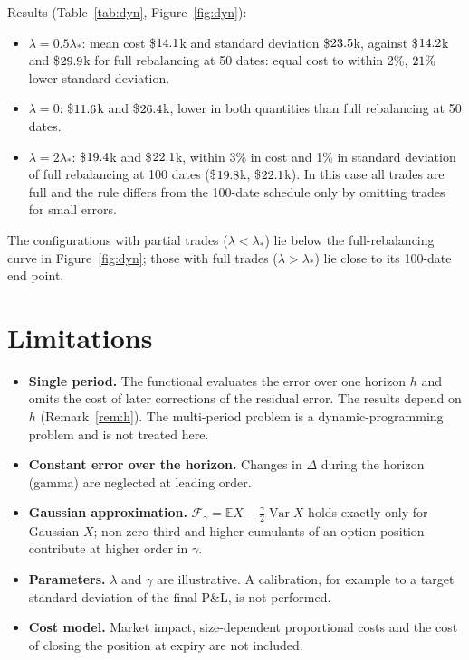 \documentclass[11pt,a4paper]{article}
\theoremstyle{remark}
\newcommand{\E}{\mathbb{E}}
\newcommand{\Var}{\operatorname{Var}}
\newcommand{\F}{\mathcal{F}}
\begin{document}
Results (Table~\ref{tab:dyn}, Figure~\ref{fig:dyn}):
\begin{itemize}
  \item $\lambda = 0.5\lambda_*$: mean cost \$$14.1$k and standard deviation
        \$$23.5$k, against \$$14.2$k and \$$29.9$k for full
        rebalancing at 50 dates: equal cost to within 2\%, $21\%$ lower
        standard deviation.
  \item $\lambda = 0$: \$$11.6$k and \$$26.4$k, lower in both quantities
        than full rebalancing at 50 dates.
  \item $\lambda = 2\lambda_*$: \$$19.4$k and \$$22.1$k, within 3\% in cost
        and 1\% in standard deviation of full rebalancing at 100 dates
        (\$$19.8$k, \$$22.1$k). In this case all trades are full and the
        rule differs from the 100-date schedule only by omitting trades for small errors.
\end{itemize}
The configurations with partial trades ($\lambda<\lambda_*$) lie below the full-rebalancing
curve in Figure~\ref{fig:dyn}; those with full trades ($\lambda>\lambda_*$) lie close to its
100-date end point.

\section{Limitations}\label{sec:limits}

\begin{itemize}
  \item \textbf{Single period.} The functional evaluates the error over one horizon $h$ and
        omits the cost of later corrections of the residual error. The results depend on
        $h$ (Remark~\ref{rem:h}). The multi-period problem is a dynamic-programming problem
        and is not treated here.
  \item \textbf{Constant error over the horizon.} Changes in $\Delta$ during the horizon
        (gamma) are neglected at leading order.
  \item \textbf{Gaussian approximation.} $\F_\gamma = \E X - \tfrac\gamma2\Var X$ holds
        exactly only for Gaussian $X$; non-zero third and higher cumulants of an option
        position contribute at higher order in $\gamma$.
  \item \textbf{Parameters.} $\lambda$ and $\gamma$ are illustrative. A calibration, for
        example to a target standard deviation of the final P\&L, is not performed.
  \item \textbf{Cost model.} Market impact, size-dependent proportional costs and the cost
        of closing the position at expiry are not included.
\end{itemize}
\end{document}
